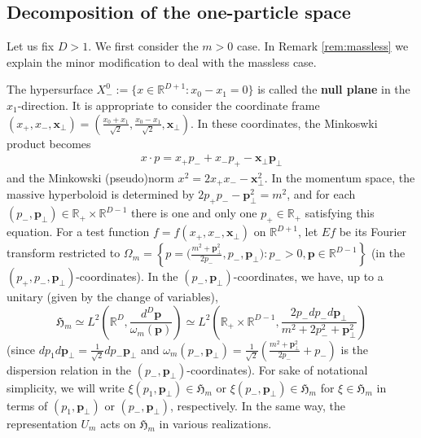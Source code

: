 \documentclass[12pt]{article}
\def\RR{{\mathbb R}}
\def\hm{\mathfrak{H}_m}
\def\tp{\pmb{p}}
\def\tx{\pmb{x}}
\theoremstyle{remark}
\begin{document}
\subsection{Decomposition of the one-particle space}\label{section-decomposition-one-particle-space}
Let us fix $D>1$. We first consider the $m>0$ case. In Remark \ref{rem:massless} we explain the minor modification to deal with the massless case.

The hypersurface $X_-^0 := \{x\in\RR^{D+1}:x_0-x_1=0\}$ is called the \textbf{null plane} in the $x_1$-direction.
It is appropriate to consider the coordinate frame $(x_+,x_-,\tx_\perp)=(\frac{x_0+x_1}{\sqrt 2}, \frac{x_0-x_1}{\sqrt 2}, \tx_\perp)$. 
In these coordinates, the Minkoswki product becomes
\begin{align}\label{eq:scprod}
 x\cdot p= x_+p_-+x_-p_+-\tx_\perp \tp_\perp
\end{align}
 and the Minkowski (pseudo)norm $x^2=2x_+x_--\tx_\perp^2$.
 In the momentum space, the massive hyperboloid is determined by $2p_+p_- -\tp_\perp^2= m^2$,
 and for each $(p_-, \tp_\perp) \in \RR_+ \times \RR^{D-1}$ there is one and only one $p_+ \in \RR_+$
 satisfying this equation.
 For a test function $f=f(x_+,x_-,\tx_\perp)$ on $\RR^{D+1}$,
 let $E f$ be its Fourier transform restricted to $\Omega_m= \left\{ p=\big({\frac{m^2+\tp_\perp^2}{2p_-}}, p_-,\tp_\perp\big): p_->0, \tp\in\RR^{D-1}\right\}$ (in the $(p_+,p_-,\tp_\perp)$-coordinates).
 In the $(p_-,\tp_\perp)$-coordinates,
 we have, up to a unitary (given by the change of variables),
 \[
  \hm \simeq L^2\left(\RR^D,  \frac{d^{D}\tp}{\omega_m(\tp)}\right) \simeq
  L^2\left(\RR_+ \times \RR^{D-1}, \frac{2p_-dp_-d\tp_\perp}{m^2+2p_-^2+\tp_\perp^2}\right)  
 \]
 (since $dp_1d\tp_\perp=\frac1{\sqrt2}dp_-\tp_\perp$ and $\omega_m (p_-,\tp_\perp)=\frac1{\sqrt2}\left(\frac{m^2+\tp_\perp^2}{2p_-}+p_-\right)$ is the dispersion relation in the $(p_-,\tp_\perp)$-coordinates).
 For sake of notational simplicity, we will write $\xi(p_1,\tp_\perp)\in \hm$ or $\xi(p_-,\tp_\perp) \in\hm$ for $\xi \in\hm$
 in terms of $(p_1,\tp_\perp)$ or $(p_-,\tp_\perp)$, respectively.
 In the same way, the representation $U_m$ acts on $\hm$ in various realizations.
 
\end{document}
